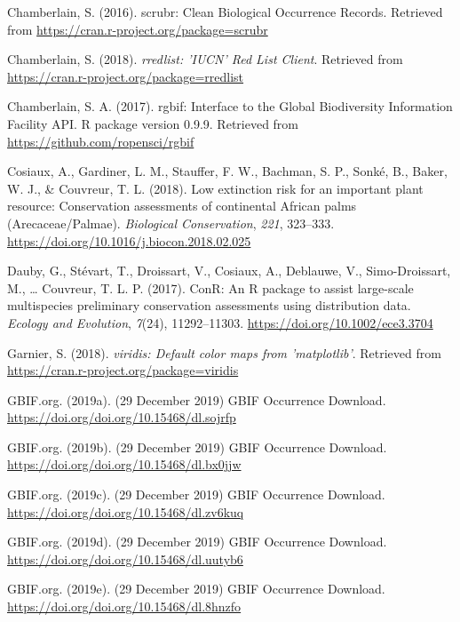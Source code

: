 \documentclass[
  12pt,
]{article}
\begin{document}
\leavevmode\hypertarget{ref-Chamberlain2016}{}%
Chamberlain, S. (2016). scrubr: Clean Biological Occurrence Records. Retrieved from \url{https://cran.r-project.org/package=scrubr}

\leavevmode\hypertarget{ref-Chamberlain2018}{}%
Chamberlain, S. (2018). \emph{rredlist: 'IUCN' Red List Client}. Retrieved from \url{https://cran.r-project.org/package=rredlist}

\leavevmode\hypertarget{ref-Chamberlain2017}{}%
Chamberlain, S. A. (2017). rgbif: Interface to the Global Biodiversity Information Facility API. R package version 0.9.9. Retrieved from \url{https://github.com/ropensci/rgbif}

\leavevmode\hypertarget{ref-Cosiaux2018}{}%
Cosiaux, A., Gardiner, L. M., Stauffer, F. W., Bachman, S. P., Sonké, B., Baker, W. J., \& Couvreur, T. L. (2018). Low extinction risk for an important plant resource: Conservation assessments of continental African palms (Arecaceae/Palmae). \emph{Biological Conservation}, \emph{221}, 323--333. \url{https://doi.org/10.1016/j.biocon.2018.02.025}

\leavevmode\hypertarget{ref-Dauby2017}{}%
Dauby, G., Stévart, T., Droissart, V., Cosiaux, A., Deblauwe, V., Simo-Droissart, M., \ldots{} Couvreur, T. L. P. (2017). ConR: An R package to assist large-scale multispecies preliminary conservation assessments using distribution data. \emph{Ecology and Evolution}, \emph{7}(24), 11292--11303. \url{https://doi.org/10.1002/ece3.3704}

\leavevmode\hypertarget{ref-Garnier2018}{}%
Garnier, S. (2018). \emph{viridis: Default color maps from 'matplotlib'}. Retrieved from \url{https://cran.r-project.org/package=viridis}

\leavevmode\hypertarget{ref-GBIForg2019}{}%
GBIF.org. (2019a). (29 December 2019) GBIF Occurrence Download. \url{https://doi.org/doi.org/10.15468/dl.sojrfp}

\leavevmode\hypertarget{ref-GBIForg2019a}{}%
GBIF.org. (2019b). (29 December 2019) GBIF Occurrence Download. \url{https://doi.org/doi.org/10.15468/dl.bx0jjw}

\leavevmode\hypertarget{ref-GBIForg2019b}{}%
GBIF.org. (2019c). (29 December 2019) GBIF Occurrence Download. \url{https://doi.org/doi.org/10.15468/dl.zv6kuq}

\leavevmode\hypertarget{ref-GBIForg2019c}{}%
GBIF.org. (2019d). (29 December 2019) GBIF Occurrence Download. \url{https://doi.org/doi.org/10.15468/dl.uutyb6}

\leavevmode\hypertarget{ref-GBIForg2019d}{}%
GBIF.org. (2019e). (29 December 2019) GBIF Occurrence Download. \url{https://doi.org/doi.org/10.15468/dl.8hnzfo}
\end{document}

